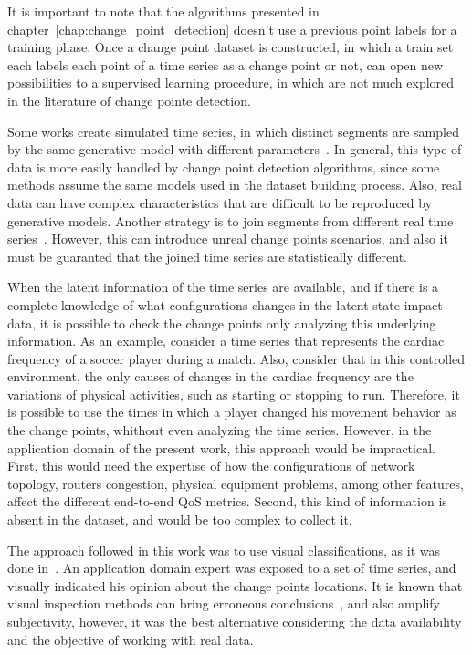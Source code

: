 It is important to note that the algorithms presented in
chapter~\ref{chap:change_point_detection} doesn't use a previous point labels
for a training phase. Once a change point dataset is constructed, in which a
train set each labels each point of a time series as a change point or not, can
open new possibilities to a supervised learning procedure, in which are not
much explored in the literature of change pointe detection.

Some works create simulated time series, in which distinct segments are sampled
by the same generative model with different
parameters~\cite{change_point_detection_in_time_series_data_by_relative_density_ratio_estimation}.
In general, this type of data is more easily handled by change point detection
algorithms, since some methods assume the same models used in the dataset
building process. Also, real data can have complex characteristics that are
difficult to be reproduced by generative models. Another strategy is to join
segments from different real time
series~\cite{inertial_hidden_markov_models_modeling_change_in_multivariate_time_series}.
However, this can introduce unreal change points scenarios, and also it must be
guaranted that the joined time series are statistically different.

When the latent information of the time series are available, and if there is a
complete knowledge of what configurations changes in the latent state impact
data, it is possible to check the change points only analyzing this underlying
information. As an example, consider a time series that represents the cardiac
frequency of a soccer player during a match. Also, consider that in this
controlled environment, the only causes of changes in the cardiac frequency are
the variations of physical activities, such as starting or stopping to run.
Therefore,
it is possible to use the times in which a player changed his movement behavior
as the change points, whithout even analyzing the time series. However, in the
application domain of the present work, this approach would be impractical.
First, this would need the expertise of how the configurations of network
topology, routers congestion, physical equipment problems, among other features,
affect the different end-to-end QoS metrics.
Second, this kind of information is absent in the dataset, and would be too
complex to collect it.

The approach followed in this work was to use visual classifications,
as it was done
in~\cite{learning_sparse_penalties_for_change_point_detection_using_max_margin_interval_regression}.
An application domain expert was exposed to a set of time series, and visually
indicated his opinion about the change points locations. It is known that visual
inspection methods can bring erroneous
conclusions~\cite{leveraging_cloud_data_to_mitigate_user_experience_from_breaking_bad},
and also amplify subjectivity, however, it was the best alternative considering
the data availability and the objective of working with real data.

